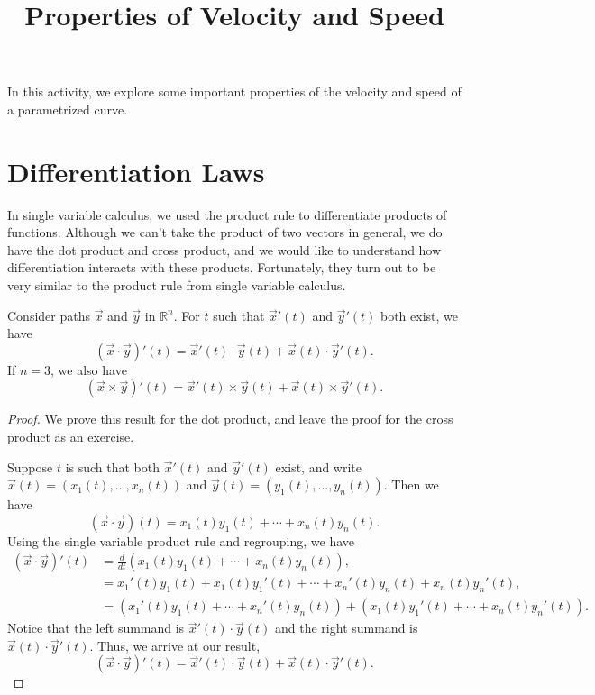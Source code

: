\documentclass{ximera}
\title{Properties of Velocity and Speed}
\begin{document}
\begin{abstract}
\end{abstract}
\maketitle

In this activity, we explore some important properties of the velocity and speed of a parametrized curve.

\section{Differentiation Laws}

In single variable calculus, we used the product rule to differentiate products of functions. Although we can't take the product of two vectors in general, we do have the dot product and cross product, and we would like to understand how differentiation interacts with these products. Fortunately, they turn out to be very similar to the product rule from single variable calculus. 

\begin{proposition}
Consider paths $\vec{x}$ and $\vec{y}$ in $\mathbb{R}^n$. For $t$ such that $\vec{x}'(t)$ and $\vec{y}'(t)$ both exist, we have
\[
(\vec{x}\cdot\vec{y})'(t) = \vec{x}'(t)\cdot \vec{y}(t) + \vec{x}(t)\cdot \vec{y}'(t).
\]
If $n=3$, we also have
\[
(\vec{x}\times \vec{y})'(t) = \vec{x}'(t)\times \vec{y}(t) + \vec{x}(t)\times \vec{y}'(t).
\]
\end{proposition}

\begin{proof}
We prove this result for the dot product, and leave the proof for the cross product as an exercise.

Suppose $t$ is such that both $\vec{x}'(t)$ and $\vec{y}'(t)$ exist, and write $\vec{x}(t) = (x_1(t),...,x_n(t))$ and $\vec{y}(t) = (y_1(t),...,y_n(t))$. Then we have
\[
(\vec{x}\cdot\vec{y})(t) = x_1(t)y_1(t) + \cdots + x_n(t)y_n(t).
\]
Using the single variable product rule and regrouping, we have
\begin{align*}
(\vec{x}\cdot\vec{y})'(t) & = \frac{d}{dt}\left(x_1(t)y_1(t) + \cdots + x_n(t)y_n(t)\right),\\
& = x_1'(t) y_1(t) + x_1(t)y_1'(t) +\cdots+x_n'(t) y_n(t) + x_n(t)y_n'(t),\\
& = \left(x_1'(t) y_1(t) + \cdots + x_n'(t) y_n(t)\right) + \left(x_1(t) y_1'(t) + \cdots + x_n(t) y_n'(t)\right).
\end{align*}
Notice that the left summand is $\vec{x}'(t)\cdot\vec{y}(t)$ and the right summand is $\vec{x}(t)\cdot\vec{y}'(t)$. Thus, we arrive at our result,
\[
(\vec{x}\cdot\vec{y})'(t) = \vec{x}'(t)\cdot \vec{y}(t) + \vec{x}(t)\cdot \vec{y}'(t).
\]
\end{proof}
\end{document}
